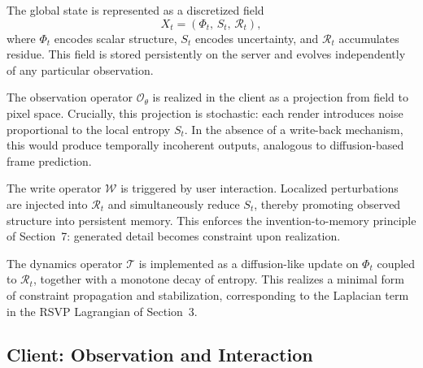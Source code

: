 \documentclass[11pt]{article}
\begin{document}
The global state is represented as a discretized field
\[
X_t = (\Phi_t,\, S_t,\, \mathcal{R}_t),
\]
where $\Phi_t$ encodes scalar structure, $S_t$ encodes uncertainty, and
$\mathcal{R}_t$ accumulates residue.
This field is stored persistently on the server and evolves independently
of any particular observation.

The observation operator $\mathcal{O}_\theta$ is realized in the client
as a projection from field to pixel space.
Crucially, this projection is stochastic: each render introduces noise
proportional to the local entropy $S_t$.
In the absence of a write-back mechanism, this would produce temporally
incoherent outputs, analogous to diffusion-based frame prediction.

The write operator $\mathcal{W}$ is triggered by user interaction.
Localized perturbations are injected into $\mathcal{R}_t$ and
simultaneously reduce $S_t$, thereby promoting observed structure into
persistent memory.
This enforces the invention-to-memory principle of Section~7: generated
detail becomes constraint upon realization.

The dynamics operator $\mathcal{T}$ is implemented as a diffusion-like
update on $\Phi_t$ coupled to $\mathcal{R}_t$, together with a monotone
decay of entropy.
This realizes a minimal form of constraint propagation and stabilization,
corresponding to the Laplacian term in the RSVP Lagrangian of Section~3.

\subsection*{Client: Observation and Interaction}
\end{document}
